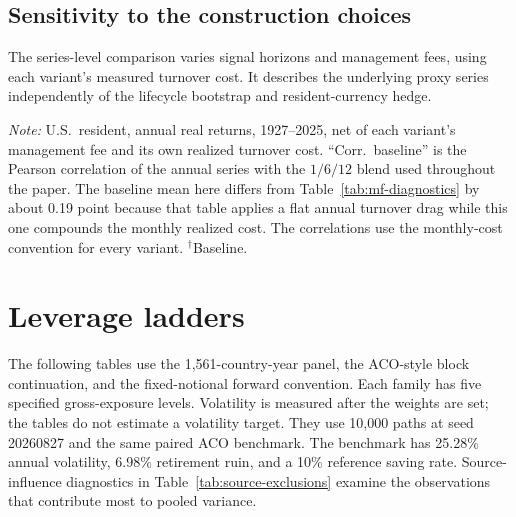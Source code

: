 \subsection{Sensitivity to the construction choices}
\label{app:mf-variants}
The series-level comparison varies signal horizons and management fees,
using each variant's measured turnover cost. It describes the underlying proxy
series independently of the lifecycle bootstrap and resident-currency hedge.
\begin{table}[H]
\centering
\caption{Managed-futures proxy under alternative construction choices}
\label{tab:mf-variants}
\small

\begin{minipage}{0.94\textwidth}\footnotesize
\textit{Note:} U.S.\ resident, annual real returns, 1927--2025, net of each
variant's management fee and its own realized turnover cost. ``Corr.\
baseline'' is the Pearson correlation of the annual series with the
$1/6/12$ blend used throughout the paper. The baseline mean here differs from
Table~\ref{tab:mf-diagnostics} by about 0.19 point because that table applies
a flat annual turnover drag while this one compounds the monthly realized cost.
The correlations use the monthly-cost convention for every variant. $^{\dagger}$Baseline.
\end{minipage}
\end{table}

\section{Leverage ladders}
\label{app:leverage-ladders}
The following tables use the 1,561-country-year panel, the
ACO-style block continuation, and the fixed-notional forward convention.
Each family has five specified gross-exposure levels. Volatility is measured
after the weights are set; the tables do not estimate a volatility target.
They use 10,000 paths at seed 20260827 and the same paired ACO benchmark.
The benchmark has 25.28\% annual volatility, 6.98\% retirement ruin, and a
10\% reference saving rate. Source-influence diagnostics in Table~\ref{tab:source-exclusions}
examine the observations that contribute most to pooled variance.

